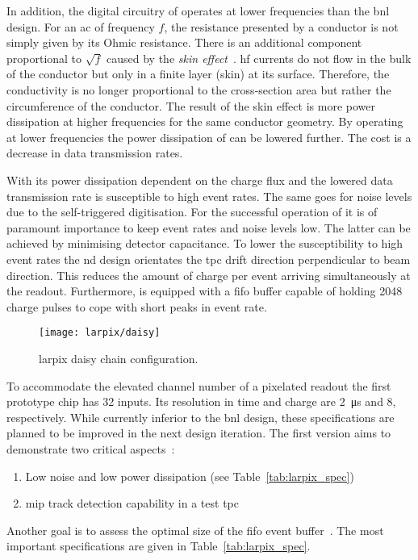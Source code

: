 In addition, the digital circuitry of \larpix{} operates at lower frequencies than the \gls{bnl} design.
For an \gls{ac} of frequency $f$, the resistance presented by a conductor is not simply given by its Ohmic resistance.
There is an additional component proportional to $\sqrt{f}$ caused by the \emph{skin effect}~\cite{horowitzHill}.
\gls{hf} currents do not flow in the bulk of the conductor but only in a finite layer (skin) at its surface.
Therefore, the conductivity is no longer proportional to the cross-section area but rather the circumference of the conductor.
The result of the skin effect is more power dissipation at higher frequencies for the same conductor geometry.
By operating at lower frequencies the power dissipation of \larpix{} can be lowered further.
The cost is a decrease in data transmission rates.

With its power dissipation dependent on the charge flux and the lowered data transmission rate \larpix{} is susceptible to high event rates.
The same goes for noise levels due to the self-triggered digitisation.
For the successful operation of \larpix{} it is of paramount importance to keep event rates and noise levels low.
The latter can be achieved by minimising detector capacitance.
To lower the susceptibility to high event rates the \dune{} \gls{nd} design orientates the \gls{tpc} drift direction perpendicular to beam direction.
This reduces the amount of charge per event arriving simultaneously at the readout.
Furthermore, \larpix{} is equipped with a \gls{fifo} buffer capable of holding \num{2048} charge pulses to cope with short peaks in event rate.

\begin{figure}[tbp]
	\centering
	\texttt{[image: larpix/daisy]}
	\caption[ daisy chain]{%
		\acrshort{larpix} daisy chain configuration.~\cite{larpix_spec}
	}
	\label{fig:larpix_daisy}
\end{figure}

To accommodate the elevated channel number of a pixelated readout the first \larpix{} prototype chip has \num{32} inputs.
Its resolution in time and charge are \SI{2}{\micro\second} and \SI{8}{\bit}, respectively.
While currently inferior to the \gls{bnl} design, these specifications are planned to be improved in the next design iteration.
The first \larpix{} version aims to demonstrate two critical aspects~\cite{dan_larpix_arcCM}:
\begin{enumerate}
	\item Low noise and low power dissipation (see Table~\ref{tab:larpix_spec})
	\item \gls{mip} track detection capability in a test \gls{tpc}
\end{enumerate}
Another goal is to assess the optimal size of the \gls{fifo} event buffer~\cite{danLarpix}.
The most important \larpix{} specifications are given in Table~\ref{tab:larpix_spec}.

